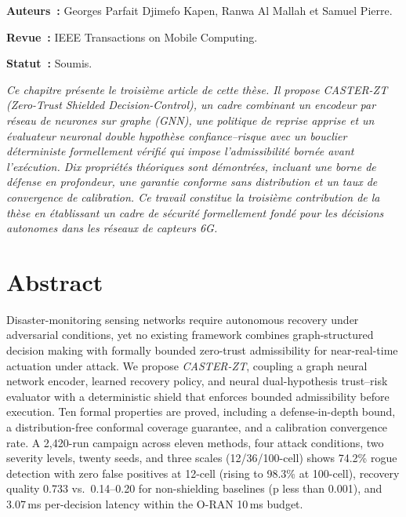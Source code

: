 \label{sec:Theme3}

\vspace{0.5cm}
\noindent\textbf{Auteurs~:} Georges Parfait Djimefo Kapen, Ranwa Al Mallah et Samuel Pierre.

\noindent\textbf{Revue~:} IEEE Transactions on Mobile Computing.

\noindent\textbf{Statut~:} Soumis.

\vspace{0.3cm}
\noindent\textit{Ce chapitre présente le troisième article de cette thèse. Il propose CASTER-ZT (Zero-Trust Shielded Decision-Control), un cadre combinant un encodeur par réseau de neurones sur graphe (GNN), une politique de reprise apprise et un évaluateur neuronal double hypothèse confiance--risque avec un bouclier déterministe formellement vérifié qui impose l'admissibilité bornée avant l'exécution. Dix propriétés théoriques sont démontrées, incluant une borne de défense en profondeur, une garantie conforme sans distribution et un taux de convergence de calibration. Ce travail constitue la troisième contribution de la thèse en établissant un cadre de sécurité formellement fondé pour les décisions autonomes dans les réseaux de capteurs 6G.}

\vspace{0.5cm}

\section{Abstract}
Disaster-monitoring sensing networks require autonomous recovery under adversarial conditions, yet no existing framework combines graph-structured decision making with formally bounded zero-trust admissibility for near-real-time actuation under attack.
We propose \emph{CASTER-ZT}, coupling a graph neural network encoder, learned recovery policy, and neural dual-hypothesis trust--risk evaluator with a deterministic shield that enforces bounded admissibility before execution.
Ten formal properties are proved, including a defense-in-depth bound, a distribution-free conformal coverage guarantee, and a calibration convergence rate.
A 2,420-run campaign across eleven methods, four attack conditions, two severity levels, twenty seeds, and three scales (12/36/100-cell) shows 74.2\% rogue detection with zero false positives at 12-cell (rising to 98.3\% at 100-cell), recovery quality 0.733 vs.\ 0.14--0.20 for non-shielding baselines (p less than 0.001), and 3.07\,ms per-decision latency within the O-RAN 10\,ms budget.


